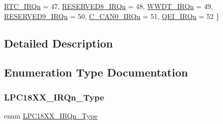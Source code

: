 \begin{DoxyCompactItemize}
\hyperlink{group___c_m_s_i_s__18_x_x___i_r_q_ggaa44deabd252bda567898bae35a086adcadcc0f2770f7f57f75fac3d8bcac0e858}{R\+T\+C\+\_\+\+I\+R\+Qn} = 47, 
\hyperlink{group___c_m_s_i_s__18_x_x___i_r_q_ggaa44deabd252bda567898bae35a086adca951c51ca47441c1892972ba4c57f5b35}{R\+E\+S\+E\+R\+V\+E\+D8\+\_\+\+I\+R\+Qn} = 48, 
\hyperlink{group___c_m_s_i_s__18_x_x___i_r_q_ggaa44deabd252bda567898bae35a086adca87a86cbd9c4a352c290aaf6f492bcce5}{W\+W\+D\+T\+\_\+\+I\+R\+Qn} = 49, 
\newline
\hyperlink{group___c_m_s_i_s__18_x_x___i_r_q_ggaa44deabd252bda567898bae35a086adca599e1e8a7dee019b56a748eccc6a5787}{R\+E\+S\+E\+R\+V\+E\+D9\+\_\+\+I\+R\+Qn} = 50, 
\hyperlink{group___c_m_s_i_s__18_x_x___i_r_q_ggaa44deabd252bda567898bae35a086adca646fe1670a0623976ee89d8ee2ffcd76}{C\+\_\+\+C\+A\+N0\+\_\+\+I\+R\+Qn} = 51, 
\hyperlink{group___c_m_s_i_s__18_x_x___i_r_q_ggaa44deabd252bda567898bae35a086adca82471ba65527ad3f3da8af38acb953bf}{Q\+E\+I\+\_\+\+I\+R\+Qn} = 52
 \}
\end{DoxyCompactItemize}


\subsection{Detailed Description}


\subsection{Enumeration Type Documentation}
\mbox{\label{group___c_m_s_i_s__18_x_x___i_r_q_gaa44deabd252bda567898bae35a086adc}} 
\subsubsection{\texorpdfstring{L\+P\+C18\+X\+X\+\_\+\+I\+R\+Qn\+\_\+\+Type}{LPC18XX\_IRQn\_Type}}
{\footnotesize\ttfamily enum \hyperlink{group___c_m_s_i_s__18_x_x___i_r_q_gaa44deabd252bda567898bae35a086adc}{L\+P\+C18\+X\+X\+\_\+\+I\+R\+Qn\+\_\+\+Type}}

